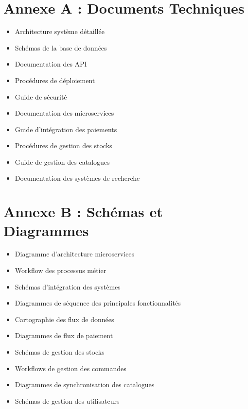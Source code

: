 \section{Annexe A : Documents Techniques}
\begin{itemize}
    \item Architecture système détaillée
    \item Schémas de la base de données
    \item Documentation des API
    \item Procédures de déploiement
    \item Guide de sécurité
    \item Documentation des microservices
    \item Guide d'intégration des paiements
    \item Procédures de gestion des stocks
    \item Guide de gestion des catalogues
    \item Documentation des systèmes de recherche
\end{itemize}

\section{Annexe B : Schémas et Diagrammes}
\begin{itemize}
    \item Diagramme d'architecture microservices
    \item Workflow des processus métier
    \item Schémas d'intégration des systèmes
    \item Diagrammes de séquence des principales fonctionnalités
    \item Cartographie des flux de données
    \item Diagrammes de flux de paiement
    \item Schémas de gestion des stocks
    \item Workflows de gestion des commandes
    \item Diagrammes de synchronisation des catalogues
    \item Schémas de gestion des utilisateurs
\end{itemize}

